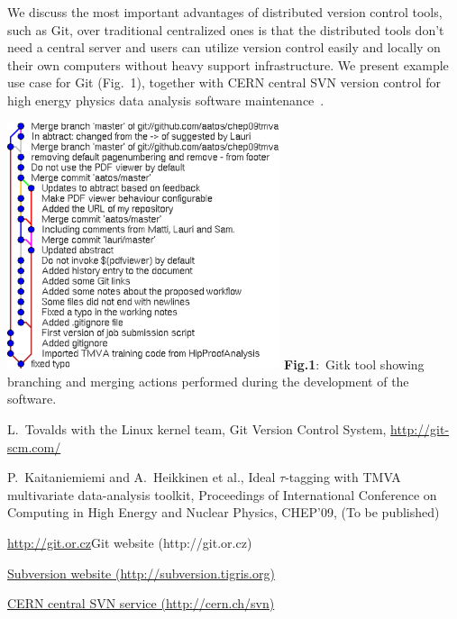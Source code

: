 \documentclass[12pt]{article}
\begin{document}
\begin{minipage}{6cm}
We discuss the most important advantages of distributed version control tools,
such as Git, over traditional centralized ones is that the distributed
tools don't need a central server and users can utilize
version control easily and locally on their own computers without
heavy support infrastructure.
We present example use case for Git (Fig.~1), 
together with CERN central SVN version control for high energy physics data
analysis software maintenance~\cite{pk09aProceedings}.

\end{minipage}
 \hfill
 \begin{minipage}{8cm}
\includegraphics[width=8cm]{gitk.eps} 
{\bf Fig.1}:~Gitk tool showing branching and merging actions
performed during the development of the software.
\end{minipage}


\begin{thebibliography}{9}
L.~Tovalds with the Linux kernel team,
Git Version Control System,
\href{http://git-scm.com/}{http://git-scm.com/}

P.~Kaitaniemiemi and A.~Heikkinen et al.,
Ideal $\tau$-tagging with TMVA multivariate data-analysis toolkit,
Proceedings of International Conference on 
Computing in High Energy and Nuclear Physics, CHEP'09,
(To be published)

\url{http://git.or.cz}{Git website (http://git.or.cz)}

\href{http://subversion.tigris.org}{Subversion website (http://subversion.tigris.org)}

\href{http://cern.ch/svn}{CERN central SVN service (http://cern.ch/svn)}
\end{thebibliography}
\end{document}
